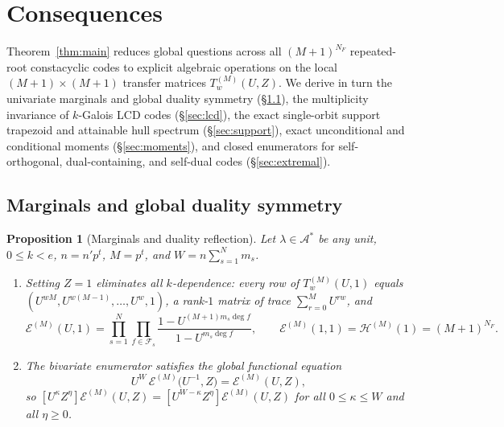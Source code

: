 \documentclass[preprint,12pt]{elsarticle}
\newcommand{\A}{\mathcal A}
\newcommand{\Fs}{\mathcal F_s}
\newcommand{\Epoly}{\mathscr E}
\newcommand{\Hpoly}{\mathscr H}
\numberwithin{equation}{section}
\theoremstyle{plain}
\newtheorem{proposition}[theorem]{Proposition}
\theoremstyle{definition}
\theoremstyle{remark}
\begin{document}
\section{Consequences}\label{sec:consequences}

Theorem~\ref{thm:main} reduces global questions across all $(M+1)^{N_F}$
repeated-root constacyclic codes to explicit algebraic operations on the local
$(M+1)\times(M+1)$ transfer matrices $T_w^{(M)}(U,Z)$. We derive in turn the
univariate marginals and global duality symmetry (\S\ref{sec:marginals}), the
multiplicity invariance of $k$-Galois LCD codes (\S\ref{sec:lcd}), the exact
single-orbit support trapezoid and attainable hull spectrum (\S\ref{sec:support}),
exact unconditional and conditional moments (\S\ref{sec:moments}), and closed
enumerators for self-orthogonal, dual-containing, and self-dual codes
(\S\ref{sec:extremal}).

\subsection{Marginals and global duality symmetry}\label{sec:marginals}

\begin{proposition}[Marginals and duality reflection]\label{prop:marginals}
Let $\lambda\in\A^*$ be any unit, $0\le k<e$, $n=n'p^t$, $M=p^t$, and
$W=n\sum_{s=1}^{N}m_s$.
\begin{enumerate}
\item[\textup{(a)}] Setting $Z=1$ eliminates all $k$-dependence: every row of
$T_w^{(M)}(U,1)$ equals $(U^{wM},U^{w(M-1)},\dots,U^w,1)$, a rank-$1$ matrix of
trace $\sum_{r=0}^{M}U^{rw}$, and
\begin{equation}\label{eq:code-marginal}
\Epoly^{(M)}(U,1)
 =\prod_{s=1}^{N}\prod_{f\in\Fs}\frac{1-U^{(M+1)m_s\deg f}}{1-U^{m_s\deg f}},
\qquad
\Epoly^{(M)}(1,1)=\Hpoly^{(M)}(1)=(M+1)^{N_F}.
\end{equation}
\item[\textup{(b)}] The bivariate enumerator satisfies the global functional equation
\begin{equation}\label{eq:duality-symmetry}
U^W\,\Epoly^{(M)}\!\bigl(U^{-1},Z\bigr)=\Epoly^{(M)}(U,Z),
\end{equation}
so $[U^\kappa Z^\eta]\Epoly^{(M)}(U,Z)=[U^{W-\kappa}Z^\eta]\Epoly^{(M)}(U,Z)$ for
all $0\le\kappa\le W$ and all $\eta\ge 0$.
\end{enumerate}
\end{proposition}
\end{document}

